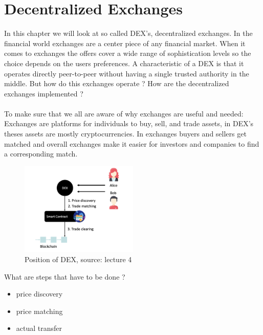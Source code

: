 \documentclass{article}
\begin{document}
\section{Decentralized Exchanges}
In this chapter we will look at so called DEX's, decentralized exchanges. In the financial world exchanges are a center piece of any financial market. When it comes to exchanges the offers cover a wide range of sophistication levels so the choice depends on the users  preferences. A characteristic of a DEX is that it operates directly peer-to-peer without having a single trusted authority in the middle. But how do this exchanges operate ? How are the decentralized exchanges implemented ?\\\\To make sure that we all are aware of why exchanges are useful and needed: Exchanges are platforms for individuals to buy, sell, and trade assets, in DEX's theses assets are mostly cryptocurrencies. In exchanges buyers and sellers get matched and overall exchanges make it easier for investors and companies to find a corresponding match.
\begin{figure}[h]
    \centering
    \includegraphics[width=0.5\textwidth]{Bildschirmfoto 2024-04-02 um 13.49.50.png} %
    \caption{Position of DEX, \scriptsize{source: lecture 4}}
    \label{fig:DoS-attack}
\end{figure}

What are steps that have to be done ?
\begin{itemize}
    \item {price discovery}
    \item {price matching}
    \item {actual transfer}
\end{itemize}
\end{document}
